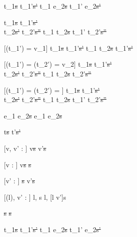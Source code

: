   {t_1\st{s} \normalise t_1'\st{s'}}
  {t_1 \Next e_2\st{s} \normalise t_1' \Next e_2\st{s'}}


  {t_1\st{s}  \normalise t_1'\st{s'} \\
   t_2\st{s'} \normalise t_2'\st{s''}}
  {t_1 \And t_2\st{s} \normalise t_1' \And t_2'\st{s''}}


[\Value(t_1') = v_1]
  {t_1\st{s}  \normalise t_1'\st{s'}}
  {t_1 \Or t_2\st{s} \normalise t_1'\st{s'}}

[\Value(t_1') = \bot \land \Value(t_2') = v_2]
  {t_1\st{s}  \normalise t_1'\st{s'} \\
   t_2\st{s'} \normalise t_2'\st{s''}}
  {t_1 \Or t_2\st{s} \normalise t_2'\st{s''}}

[\Value(t_1') = \bot \land \Value(t_2') = \bot]
  {t_1\st{s}  \normalise t_1'\st{s'} \\
   t_2\st{s'} \normalise t_2'\st{s''}}
  {t_1 \Or t_2\st{s} \normalise t_1' \Or t_2'\st{s''}}


  { }
  {e_1 \Xor e_2\st{s} \normalise e_1 \Xor e_2\st{s}}









  {t\st{s}  t'\st{s'}}


[v, v' : \beta]
  { }
  {\Edit v\st{s}  \Edit v'\st{s}}

[v : \beta]
  { }
  {\Edit v\st{s} \handle{\Clear} \Enter \beta\st{s}}

[v' : \beta]
  { }
  {\Enter \beta\st{s}  \Edit v'\st{s}}

[\Sigma(l), v' : \beta]
  { }
  {\Store l, s  \Store l, [l \mapsto v']s}


  { }
  {\Fail\st{s}  \Fail\st{s}}


  {t_1\st{s}  t_1'\st{s'}}
  {t_1 \Then e_2\st{s}  t_1' \Then e_2\st{s'}}

